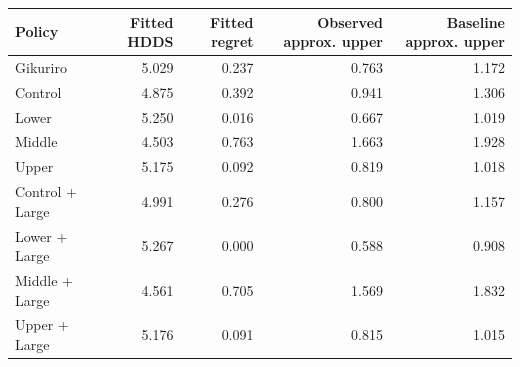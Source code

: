 \begin{tabular}{lrrrr}
\toprule
Policy & Fitted HDDS & Fitted regret & Observed approx. upper & Baseline approx. upper \\
\midrule
Gikuriro & 5.029 & 0.237 & 0.763 & 1.172 \\
Control & 4.875 & 0.392 & 0.941 & 1.306 \\
Lower & 5.250 & 0.016 & 0.667 & 1.019 \\
Middle & 4.503 & 0.763 & 1.663 & 1.928 \\
Upper & 5.175 & 0.092 & 0.819 & 1.018 \\
Control + Large & 4.991 & 0.276 & 0.800 & 1.157 \\
Lower + Large & 5.267 & 0.000 & 0.588 & 0.908 \\
Middle + Large & 4.561 & 0.705 & 1.569 & 1.832 \\
Upper + Large & 5.176 & 0.091 & 0.815 & 1.015 \\
\bottomrule
\end{tabular}
